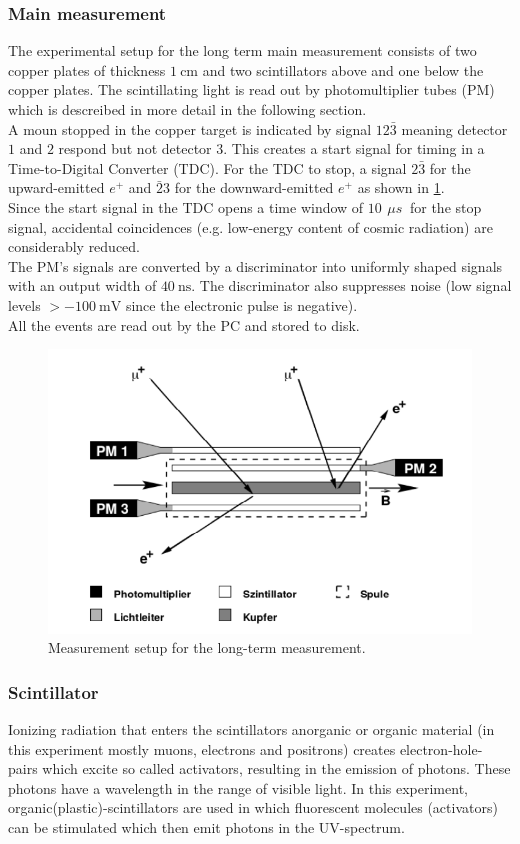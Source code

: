 \documentclass[english,  %
parskip=full,   %
headsepline]{scrartcl}
\newcommand{\mus}{\,\si{\mu s\:}}
\begin{document}
\subsubsection{Main measurement}
The experimental setup for the long term  main measurement consists of two copper plates of thickness $\SI{1}{\cm}$ and two scintillators above and one below the copper plates. The scintillating light is read out by photomultiplier tubes (PM) which is descreibed in more detail in the following section.\\
A moun stopped in the copper target is indicated by signal $\mathfrak{12\bar{3}}$ meaning detector $\mathfrak{1}$ and $\mathfrak{2}$ respond but not detector $\mathfrak{3}$. This creates a start signal for timing in a Time-to-Digital Converter (TDC). For the TDC to stop, a signal $\mathfrak{2\bar{3}}$ for the upward-emitted $e^+$ and $\mathfrak{\bar{2}3}$ for the downward-emitted $e^+$ as shown in \cref{fig:setup}.\\
Since the start signal in the TDC opens a time window of $\SI{10}{\mus}$ for the stop signal, accidental coincidences (e.g. low-energy content of cosmic radiation) are considerably reduced.\\
The PM's signals are converted by a discriminator into uniformly shaped signals with an output width of $\SI{40}{\nano \second}$. The discriminator also suppresses noise (low signal levels $>\SI{-100}{\milli \volt}$ since the electronic pulse is negative).\\
All the events are read out by the PC and stored to disk.
\begin{figure}[H]
    \centering
    \includegraphics[width=0.6\linewidth]{setup.png}
    \caption{Measurement setup for the long-term measurement. \cite{anleitung}}
    \label{fig:setup}
\end{figure}
\subsubsection{Scintillator}
Ionizing radiation that enters the scintillators anorganic or organic material (in this experiment mostly muons, electrons and positrons) creates electron-hole-pairs which excite so called activators, resulting in the emission of photons. These photons have a wavelength in the range of visible light. In this experiment, organic(plastic)-scintillators are used in which fluorescent molecules (activators) can be stimulated which then emit photons in the UV-spectrum.
\end{document}
